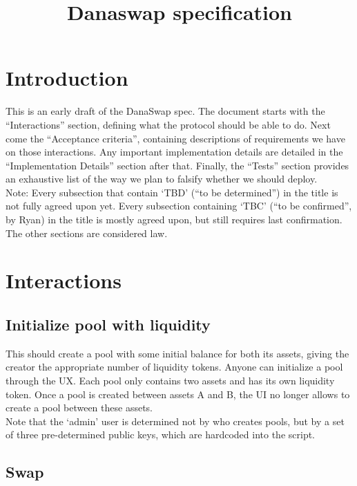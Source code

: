 \documentclass{article}
\title{Danaswap specification}
\begin{document}
\maketitle

\begingroup
  \hypersetup{hidelinks}
  \tableofcontents
\endgroup
\newpage

\section{Introduction}

This is an early draft of the DanaSwap spec. The document starts with the
``Interactions'' section, defining what the protocol should be able to do. Next
come the ``Acceptance criteria'', containing descriptions of requirements we
have on those interactions. Any important implementation details are detailed in
the ``Implementation Details'' section after that. Finally, the ``Tests''
section provides an exhaustive list of the way we plan to falsify whether we
should deploy.  \\

Note: Every subsection that contain `TBD' (``to be determined'') in the title is
not fully agreed upon yet. Every subsection containing `TBC' (``to be
confirmed'', by Ryan) in the title is mostly agreed upon, but still requires
last confirmation. The other sections are considered law.

\section{Interactions}

\subsection*{Initialize pool with liquidity}

This should create a pool with some initial balance for both its assets, giving
the creator the appropriate number of liquidity tokens. Anyone can initialize a
pool through the UX. Each pool only contains two assets and has its own
liquidity token. Once a pool is created between assets A and B, the UI no longer
allows to create a pool between these assets. \\

Note that the `admin' user is determined not by who creates pools, but by a set
of three pre-determined public keys, which are hardcoded into the script.

\subsection*{Swap}
\end{document}
